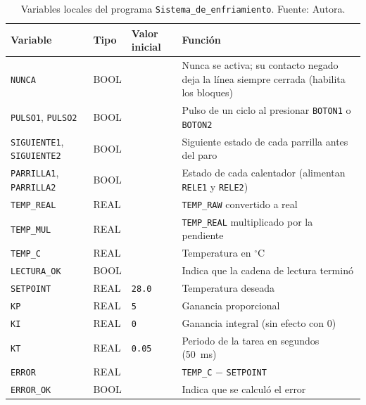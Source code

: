 \documentclass[12pt,a4paper]{article}
\begin{document}
\begin{table}[H]
\centering
\caption{Variables locales del programa
\texttt{Sistema\_\allowbreak de\_\allowbreak enfriamiento}. Fuente: Autora.}
\label{tab:p2_vars}
\linespread{1}\small\selectfont
\renewcommand{\arraystretch}{1.1}
\begin{tabularx}{\linewidth}{l l l X}
\toprule
\textbf{Variable} & \textbf{Tipo} & \textbf{Valor inicial} & \textbf{Función} \\
\midrule
\texttt{NUNCA}                      & BOOL  &                  & Nunca se activa; su contacto negado deja la línea siempre cerrada (habilita los bloques) \\
\texttt{PULSO1}, \texttt{PULSO2}    & BOOL  &                  & Pulso de un ciclo al presionar \texttt{BOTON1} o \texttt{BOTON2} \\
\texttt{SIGUIENTE1}, \texttt{SIGUIENTE2} & BOOL &               & Siguiente estado de cada parrilla antes del paro \\
\texttt{PARRILLA1}, \texttt{PARRILLA2} & BOOL &                 & Estado de cada calentador (alimentan \texttt{RELE1} y \texttt{RELE2}) \\
\texttt{TEMP\_REAL}                 & REAL  &                  & \texttt{TEMP\_RAW} convertido a real \\
\texttt{TEMP\_MUL}                  & REAL  &                  & \texttt{TEMP\_REAL} multiplicado por la pendiente \\
\texttt{TEMP\_C}                    & REAL  &                  & Temperatura en $^\circ$C \\
\texttt{LECTURA\_OK}                & BOOL  &                  & Indica que la cadena de lectura terminó \\
\texttt{SETPOINT}                   & REAL  & \texttt{28.0}    & Temperatura deseada \\
\texttt{KP}                         & REAL  & \texttt{5}       & Ganancia proporcional \\
\texttt{KI}                         & REAL  & \texttt{0}       & Ganancia integral (sin efecto con 0) \\
\texttt{KT}                         & REAL  & \texttt{0.05}    & Periodo de la tarea en segundos (50~ms) \\
\texttt{ERROR}                      & REAL  &                  & \texttt{TEMP\_C} $-$ \texttt{SETPOINT} \\
\texttt{ERROR\_OK}                  & BOOL  &                  & Indica que se calculó el error \\

\end{tabularx}
\end{table}
\end{document}
